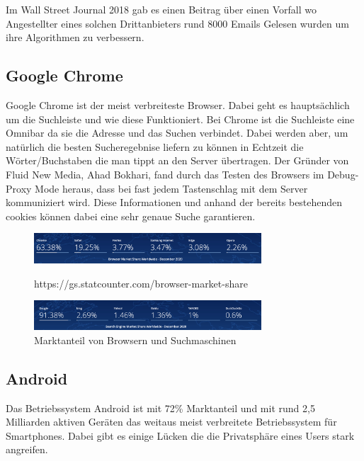 \documentclass{article}
\begin{document}
Im Wall Street Journal 2018 gab es einen Beitrag über einen Vorfall wo Angestellter eines solchen Drittanbieters rund 8000 Emails Gelesen wurden um ihre Algorithmen zu verbessern.

\subsection{Google Chrome}
Google Chrome ist der meist verbreiteste Browser. Dabei geht es hauptsächlich um die Suchleiste und wie diese Funktioniert. Bei Chrome ist die Suchleiste eine Omnibar da sie die Adresse und das Suchen verbindet. Dabei werden aber, um natürlich die besten Sucheregebnise liefern zu können in Echtzeit die Wörter/Buchstaben die man tippt an den Server übertragen. Der Gründer von Fluid New Media, Ahad Bokhari, fand durch das Testen des Browsers im Debug-Proxy Mode heraus, dass bei fast jedem Tastenschlag mit dem Server kommuniziert wird. Diese Informationen und anhand der bereits bestehenden cookies können dabei eine sehr genaue Suche garantieren.


\begin{figure}[htb]
    \begin{minipage}[b]{1.0\linewidth}
      \centering
      \centerline{\includegraphics[width=8.5cm]{browsermarketshare.png}}
      \centerline{https://gs.statcounter.com/browser-market-share}\medskip
    \end{minipage}

    \begin{minipage}[b]{1.0\linewidth}
      \centering
      \centerline{\includegraphics[width=8.5cm]{googlesearchmarketshare.png}}
    \end{minipage}
    \caption{Marktanteil von Browsern und Suchmaschinen\cite{bms}\cite{sems}}
\end{figure}


\subsection{Android}
Das Betriebssystem Android ist mit 72\% Marktanteil und mit rund 2,5 Milliarden aktiven Geräten das weitaus meist verbreitete Betriebssystem für Smartphones. Dabei gibt es einige Lücken die die Privatsphäre eines Users stark angreifen. 
\end{document}
